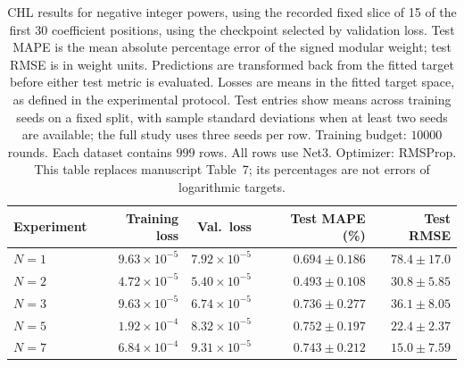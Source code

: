 \begin{table}[!htbp]
\centering
\small
\setlength{\tabcolsep}{4pt}
\renewcommand{\arraystretch}{1.18}
\begin{tabular}{@{}lrrrr@{}}
\toprule
Experiment & Training loss & Val.\ loss & Test MAPE (\%) & Test RMSE \\
\midrule
$N=1$ & $9.63\times10^{-5}$ & $7.92\times10^{-5}$ & $0.694\pm0.186$ & $78.4\pm17.0$ \\
$N=2$ & $4.72\times10^{-5}$ & $5.40\times10^{-5}$ & $0.493\pm0.108$ & $30.8\pm5.85$ \\
$N=3$ & $9.63\times10^{-5}$ & $6.74\times10^{-5}$ & $0.736\pm0.277$ & $36.1\pm8.05$ \\
$N=5$ & $1.92\times10^{-4}$ & $8.32\times10^{-5}$ & $0.752\pm0.197$ & $22.4\pm2.37$ \\
$N=7$ & $6.84\times10^{-4}$ & $9.31\times10^{-5}$ & $0.743\pm0.212$ & $15.0\pm7.59$ \\
\bottomrule
\end{tabular}
\caption{\textsf{CHL results for negative integer powers, using the recorded fixed slice of 15 of the first 30 coefficient positions, using the checkpoint selected by validation loss. Test MAPE is the mean absolute percentage error of the signed modular weight; test RMSE is in weight units. Predictions are transformed back from the fitted target before either test metric is evaluated. Losses are means in the fitted target space, as defined in the experimental protocol. Test entries show means across training seeds on a fixed split, with sample standard deviations when at least two seeds are available; the full study uses three seeds per row. Training budget: $10000$ rounds. Each dataset contains $999$ rows. All rows use Net3. Optimizer: RMSProp. This table replaces manuscript Table~7; its percentages are not errors of logarithmic targets.}}
\label{tab:chl-revised-7-best}
\end{table}
